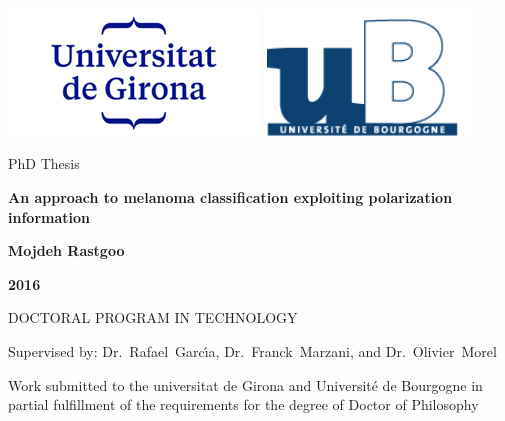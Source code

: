 \newpage
\thispagestyle{empty}

\vspace{3cm}
\begin{center}
\includegraphics[width=0.5\textwidth]{Figures/logo/udglogo2.png}\
\includegraphics[width= 0.4\textwidth]{Figures/logo/logoub.png}
\end{center}
\vspace{0.3cm}
\begin{center}
PhD Thesis
\end{center}
\vspace{0.7cm}
\begin{center}
\LARGE{\LARGE{\textbf{An approach to melanoma classification exploiting polarization information
}}}
\end{center}
\vspace{0.5cm}
\begin{center}
{\large{\textbf{Mojdeh Rastgoo}}}
\end{center}
\vspace{0.5cm}
\begin{center}
\textbf{2016}
\end{center}
\vspace{0.5cm}
\begin{center}
DOCTORAL PROGRAM IN TECHNOLOGY 
\end{center}
\vspace{0.5cm}
\begin{center}
Supervised by: Dr.~Rafael~Garc\'{\i}a, Dr.~Franck~Marzani, and Dr.~Olivier~Morel
\end{center}
\vspace{0.5cm}
\begin{center}
Work submitted to the universitat de Girona and Universit\'e de Bourgogne in partial fulfillment of the requirements for the degree of Doctor of Philosophy
\end{center}

